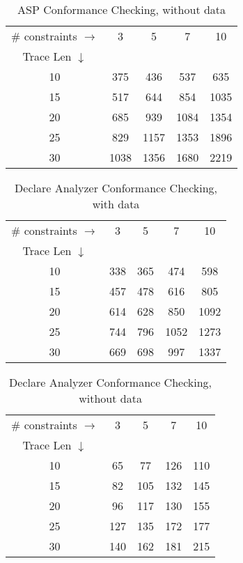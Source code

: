 \begin{table}
\centering
\caption{ASP Conformance Checking, without data}
\label{tab:aspCCWOData}
\begin{tabular}{|c|cccc|}
\hline
\# constraints $\rightarrow$ & 3 & 5 & 7 & 10 \\
\cline{1-1}
Trace Len  $\downarrow$      &   &   &   &   \\
\hline
10 & 	375 & 436 & 537 & 635 \\
15 & 	517 & 644 & 854 & 1035 \\
20 & 	685 & 939 & 1084 & 1354 \\
25 & 	829 & 1157 & 1353 & 1896 \\
30 & 	1038 & 1356 & 1680 & 2219 \\
\hline
\end{tabular}
\end{table}

\begin{table}
\centering
\caption{Declare Analyzer Conformance Checking, with data}
\label{tab:DecAnCCWData}
\begin{tabular}{|c|cccc|}
\hline
\# constraints $\rightarrow$ & 3 & 5 & 7 & 10 \\
\cline{1-1}
Trace Len  $\downarrow$      &   &   &   &   \\
\hline
10 & 	338 & 365 & 474 & 598 \\
15 & 	457 & 478 & 616 & 805 \\
20 & 	614 & 628 & 850 & 1092 \\
25 & 	744 & 796 & 1052 & 1273 \\
30 & 	669 & 698 & 997 & 1337 \\
\hline
\end{tabular}
\end{table}

\begin{table}
\centering
\caption{Declare Analyzer Conformance Checking, without data}
\label{tab:DecAnCCWOData}
\begin{tabular}{|c|cccc|}
\hline
\# constraints $\rightarrow$ & 3 & 5 & 7 & 10 \\
\cline{1-1}
Trace Len  $\downarrow$      &   &   &   &   \\
\hline
10 & 	65 & 77 & 126 & 110 \\
15 & 	82 & 105 & 132 & 145 \\
20 & 	96 & 117 & 130 & 155 \\
25 & 	127 & 135 & 172 & 177 \\
30 & 	140 & 162 & 181 & 215 \\
\hline
\end{tabular}
\end{table}

